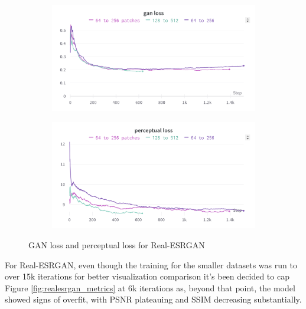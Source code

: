 \begin{figure}[H]
  \centering
  \begin{subfigure}{.5\textwidth}
    \centering
    \includegraphics[width=1\linewidth]{figures/RealESRGAN_gan_loss.png}
    \label{fig:realesrgan_psnr}
  \end{subfigure}%
  \begin{subfigure}{.5\textwidth}
    \centering
    \includegraphics[width=1\linewidth]{figures/RealESRGAN_perceptual.png}
    \label{fig:realesrgan_ssim}
  \end{subfigure}
  \caption{GAN loss and perceptual loss for Real-ESRGAN}
  \label{fig:realesrgan_losses}
\end{figure}

For Real-ESRGAN, even though the training for the smaller datasets was run to over 15k iterations for better visualization comparison it's been decided to cap Figure \ref{fig:realesrgan_metrics} at 6k iterations as, beyond that point, the model showed signs of overfit, with PSNR plateauing and SSIM decreasing substantially.

